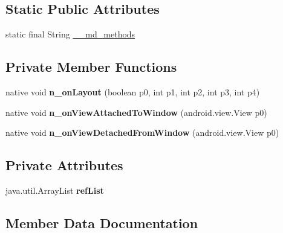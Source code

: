 \subsection*{Static Public Attributes}
\begin{DoxyCompactItemize}
\item 
static final String \hyperlink{classmd5b60ffeb829f638581ab2bb9b1a7f4f3f_1_1ButtonRenderer_a9e989b257f85aa8a9f7b8ec7a324a423}{\+\_\+\+\_\+md\+\_\+methods}
\end{DoxyCompactItemize}
\subsection*{Private Member Functions}
\begin{DoxyCompactItemize}
\item 
\mbox{\label{classmd5b60ffeb829f638581ab2bb9b1a7f4f3f_1_1ButtonRenderer_a3d85bf7ad5f9368589a177164ef752bd}} 
native void {\bfseries n\+\_\+on\+Layout} (boolean p0, int p1, int p2, int p3, int p4)
\item 
\mbox{\label{classmd5b60ffeb829f638581ab2bb9b1a7f4f3f_1_1ButtonRenderer_ae11be655e3149b651da2d9352cea7df7}} 
native void {\bfseries n\+\_\+on\+View\+Attached\+To\+Window} (android.\+view.\+View p0)
\item 
\mbox{\label{classmd5b60ffeb829f638581ab2bb9b1a7f4f3f_1_1ButtonRenderer_a702a0699c60f3404a3f34f8917d769a1}} 
native void {\bfseries n\+\_\+on\+View\+Detached\+From\+Window} (android.\+view.\+View p0)
\end{DoxyCompactItemize}
\subsection*{Private Attributes}
\begin{DoxyCompactItemize}
\item 
\mbox{\label{classmd5b60ffeb829f638581ab2bb9b1a7f4f3f_1_1ButtonRenderer_ac9e5222d65858404501d5566e4a2de8a}} 
java.\+util.\+Array\+List {\bfseries ref\+List}
\end{DoxyCompactItemize}


\subsection{Member Data Documentation}
\mbox{\label{classmd5b60ffeb829f638581ab2bb9b1a7f4f3f_1_1ButtonRenderer_a9e989b257f85aa8a9f7b8ec7a324a423}} 
